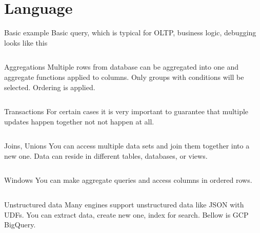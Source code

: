 \documentclass[t,pdf]{beamer}
\begin{document}
\section{Language}

\begin{frame}{Basic example}
Basic query, which is typical for OLTP, business logic, debugging looks like this

\begin{mdframed}[style=codeframe]\inputminted{sql}{basic.sql}\end{mdframed}
\end{frame}

\begin{frame}{Aggregations}
Multiple rows from database can be aggregated into one and aggregate functions applied to columns. Only groups with conditions will be selected. Ordering is applied.

\begin{mdframed}[style=codeframe]\inputminted{sql}{aggregations.sql}\end{mdframed}
\end{frame}

\begin{frame}{Transactions}
For certain cases it is very important to guarantee that multiple updates happen together not not happen at all.

\begin{mdframed}[style=codeframe]\inputminted{sql}{transactions.sql}\end{mdframed}
\end{frame}

\begin{frame}{Joins, Unions}
You can access multiple data sets and join them together into a new one. 
Data can reside in different tables, databases, or views.

\begin{mdframed}[style=codeframe]\inputminted{sql}{joins.sql}\end{mdframed}
\end{frame}

\begin{frame}{Windows}
You can make aggregate queries and access columns in ordered rows.

\begin{mdframed}[style=codeframe]\inputminted{sql}{windows.sql}\end{mdframed}
\end{frame}

\begin{frame}{Unstructured data}
Many engines support unstructured data like JSON with UDFs. You can extract data, create new one, index for search. Bellow is GCP BigQuery.

\begin{mdframed}[style=codeframe]\inputminted{sql}{unstructured.sql}\end{mdframed}
\end{frame}
\end{document}
